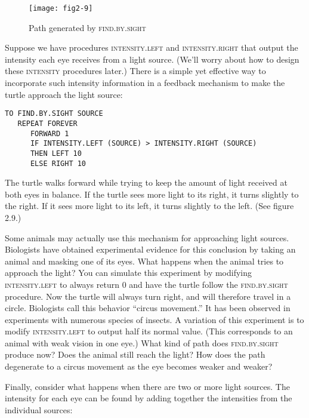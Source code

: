 \documentclass{book}
\begin{document}
\begin{figure}
\begin{center}
\texttt{[image: fig2-9]}
\caption{Path generated by \textsc{find}\textsc{.by}\textsc{.sight}}
\end{center}
\end{figure}

Suppose we have procedures \textsc{intensity.left} and \textsc{intensity.right}
that output the intensity each eye receives from a light source. (We'll
worry about how to design these \textsc{intensity} procedures later.) There is
a simple yet effective way to incorporate such intensity information in a
feedback mechanism to make the turtle approach the light source:

\begin{verbatim}
TO FIND.BY.SIGHT SOURCE
   REPEAT FOREVER
      FORWARD 1
      IF INTENSITY.LEFT (SOURCE) > INTENSITY.RIGHT (SOURCE)
      THEN LEFT 10
      ELSE RIGHT 10
\end{verbatim}
The turtle walks forward while trying to keep the amount of light
received at both eyes in balance. If the turtle sees more light to its
right, it turns slightly to the right. If it sees more light to its left, it
turns slightly to the left. (See figure 2.9.)

Some animals may actually use this mechanism for approaching light
sources. Biologists have obtained experimental evidence for this conclusion by taking an animal and masking one of its eyes. What happens
when the animal tries to approach the light? You can simulate this experiment by modifying \textsc{intensity.left} to always return 0 and have
the turtle follow the \textsc{find.by.sight} procedure. Now the turtle will always turn right, and will therefore travel in a circle. Biologists call this
behavior ``circus movement.'' It has been observed in experiments with
numerous species of insects.
A variation of this experiment is to modify \textsc{intensity.left} to output
half its normal value. (This corresponds to an animal with weak vision
in one eye.) What kind of path does \textsc{find.by.sight} produce now? Does
the animal still reach the light? How does the path degenerate to a circus
movement as the eye becomes weaker and weaker?

Finally, consider what happens when there are two or more light
sources. The intensity for each eye can be found by adding together
the intensities from the individual sources:
\end{document}
